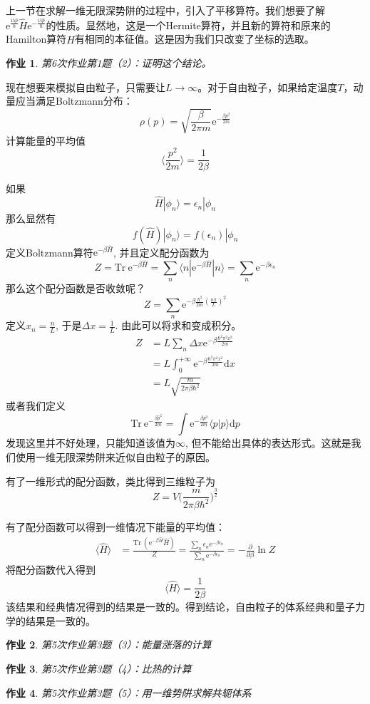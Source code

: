 \documentclass[12pt]{article}
\newtheorem{asg}{作业}
\begin{document}
    上一节在求解一维无限深势阱的过程中，引入了平移算符。我们想要了解$\mathrm{e}^{\frac {\mathrm{i}\lambda \hat{p}}{\hbar}} \hat{H} \mathrm{e}^{-\frac {\mathrm{i}\lambda \hat{p}}{\hbar}}$的性质。显然地，这是一个Hermite算符，并且新的算符和原来的Hamilton算符$\hat{H}$有相同的本征值。这是因为我们只改变了坐标的选取。
    \begin{asg}
        第6次作业第1题（2）：证明这个结论。
    \end{asg}
    现在想要来模拟自由粒子，只需要让$L \to \infty$。对于自由粒子，如果给定温度$T$，动量应当满足Boltzmann分布：
    \[ \rho(p) = \sqrt{\frac {\beta}{2\pi m}}\mathrm{e}^{-\frac {\beta p^2}{2m}} \]
    计算能量的平均值
    \[ \langle \frac {p^2}{2m} \rangle = \frac 1{2\beta} \]

    如果
    \[ \hat{H} | \phi_n \rangle = \epsilon_n |\phi_n \]
    那么显然有
    \[ f(\hat{H})|\phi_n \rangle = f(\epsilon_n)|\phi_n \]
    定义Boltzmann算符$\mathrm{e}^{-\beta\hat{H}}$, 并且定义配分函数为
    \[ Z = \mathrm{Tr}\  \mathrm{e}^{-\beta \hat{H}} = \sum_n \langle n| \mathrm{e}^{-\beta \hat{H}} | n \rangle = \sum_n \mathrm{e}^{-\beta \epsilon_n }\]
    那么这个配分函数是否收敛呢？
    \[ Z = \sum_n \mathrm{e}^{-\beta \frac {\hbar^2}{2m} (\frac {n\pi}L)^2} \]
    定义$x_n = \frac nL$, 于是$\Delta x = \frac 1L$. 由此可以将求和变成积分。
    \begin{align*}
        Z &= L \sum_n \Delta x \mathrm{e}^{-\beta \frac {\hbar^2\pi^2 x^2}{2m} }\\
        &= L \int_0^{+\infty} \mathrm{e}^{-\beta \frac {\hbar^2\pi^2 x^2}{2m}} \mathrm{d}x\\
        &= L\sqrt{\frac m{2\pi \beta \hbar^2}}
    \end{align*}
    或者我们定义
    \[ \mathrm{Tr} \ \mathrm{e}^{-\frac {\beta \hat{p}^2}{2m}} = \int \mathrm{e}^{-\frac {\beta p^2}{2m}} \langle p|p\rangle \mathrm{d}p \]
    发现这里并不好处理，只能知道该值为$\infty$, 但不能给出具体的表达形式。这就是我们使用一维无限深势阱来近似自由粒子的原因。

    有了一维形式的配分函数，类比得到三维粒子为
    \[ Z = V \bigg(\frac m{2\pi \beta \hbar^2}\bigg)^{\frac 32} \]

    有了配分函数可以得到一维情况下能量的平均值：
    \begin{align*}
        \langle \hat{H} \rangle &= \frac {\mathrm{Tr} \ (\mathrm{e}^{-\beta \hat{H}} \hat{H})}Z
        = \frac {\sum_n \epsilon_n \mathrm{e}^{-\beta \epsilon_n}}{\sum_n \mathrm{e}^{-\beta \epsilon_n}}
        = -\frac {\partial}{\partial \beta} \ln{Z}
    \end{align*}
    将配分函数代入得到
    \[ \langle \hat{H} \rangle = \frac 1{2\beta} \]
    该结果和经典情况得到的结果是一致的。得到结论，自由粒子的体系经典和量子力学的结果是一致的。
    \begin{asg}
        第5次作业第3题（3）：能量涨落的计算
    \end{asg}
    \begin{asg}
        第5次作业第3题（4）：比热的计算
    \end{asg}
    \begin{asg}
        第5次作业第3题（5）：用一维势阱求解共轭体系
    \end{asg}
\end{document}
